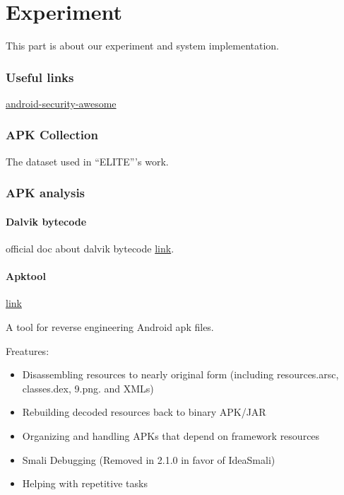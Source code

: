 
\part{Experiment}

This part is about our experiment and system implementation.


\section{Useful links}

\href{https://github.com/ashishb/android-security-awesome}
{android-security-awesome}



\section{APK Collection}

The dataset used in ``ELITE'''s work.

\section{APK analysis}

\subsection{Dalvik bytecode}

official doc about dalvik bytecode 
\href{https://source.android.com/devices/tech/dalvik/dalvik-bytecode}
{link}.


\subsection{Apktool}

\href{https://ibotpeaches.github.io/Apktool/}{link}

A tool for reverse engineering Android apk files.

Freatures:
\begin{itemize}
\item Disassembling resources to nearly original form (including resources.arsc,
  classes.dex, 9.png. and XMLs)
\item Rebuilding decoded resources back to binary APK/JAR
\item Organizing and handling APKs that depend on framework resources
\item Smali Debugging (Removed in 2.1.0 in favor of IdeaSmali)
\item Helping with repetitive tasks
\end{itemize}

